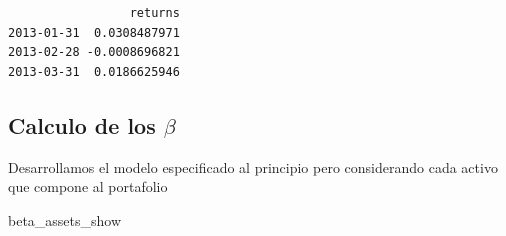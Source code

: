 \documentclass[
  letterpaper,
  DIV=11,
  numbers=noendperiod]{scrartcl}
\newenvironment{Shaded}{\begin{snugshade}}{\end{snugshade}}
\newcommand{\AttributeTok}[1]{\textcolor[rgb]{0.40,0.45,0.13}{#1}}
\newcommand{\DecValTok}[1]{\textcolor[rgb]{0.68,0.00,0.00}{#1}}
\newcommand{\FunctionTok}[1]{\textcolor[rgb]{0.28,0.35,0.67}{#1}}
\newcommand{\NormalTok}[1]{\textcolor[rgb]{0.00,0.23,0.31}{#1}}
\newcommand{\OtherTok}[1]{\textcolor[rgb]{0.00,0.23,0.31}{#1}}
\newcommand{\SpecialCharTok}[1]{\textcolor[rgb]{0.37,0.37,0.37}{#1}}
\begin{document}
\begin{verbatim}
                 returns
2013-01-31  0.0308487971
2013-02-28 -0.0008696821
2013-03-31  0.0186625946
\end{verbatim}

\subsection{\texorpdfstring{Calculo de los
\(\beta\)}{Calculo de los \textbackslash beta}}\label{calculo-de-los-beta}

Desarrollamos el modelo especificado al principio pero considerando cada
activo que compone al portafolio

\begin{Shaded}
\end{Shaded}

\begin{Shaded}
\begin{Highlighting}[]
\NormalTok{beta\_assets\_show}
\end{Highlighting}
\end{Shaded}
\end{document}
